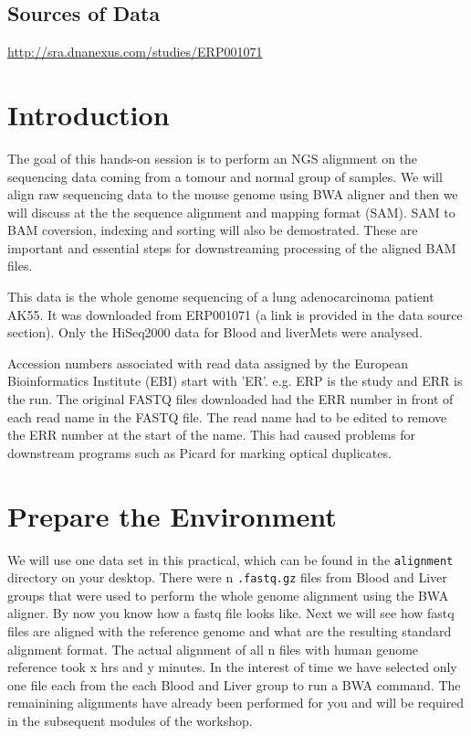 \subsection{Sources of Data}
  \url{http://sra.dnanexus.com/studies/ERP001071}

\clearpage

\section{Introduction}

\begin{information}
The goal of this hands-on session is to perform an NGS alignment on the sequencing data coming from a tomour and normal group of samples. We will align raw sequencing data to the mouse genome using BWA aligner and then we will discuss at the the sequence alignment and mapping format (SAM). SAM to BAM coversion, indexing and sorting will also be demostrated. These are important and essential steps for downstreaming processing of the aligned BAM files. 
 
This data is the whole genome sequencing of a lung adenocarcinoma patient AK55. It was downloaded from ERP001071 (a link is provided in the data source section). Only the HiSeq2000 data for Blood and liverMets were analysed.

Accession numbers associated with read data assigned by the European Bioinformatics Institute (EBI) start with 'ER'. e.g. ERP is the study and ERR is the run. The original FASTQ files downloaded had the ERR number in front of each read name in the FASTQ file. The read name had to be edited to remove the ERR number at the start of the name. This had caused problems for downstream programs such as Picard for marking optical duplicates.

\end{information}

\section{Prepare the Environment}

\begin{information}
We will use one data set in this practical, which can be found in the \texttt{alignment}
directory on your desktop.
There were n \texttt{.fastq.gz} files from Blood and Liver groups that were used to perform the whole genome alignment using the BWA aligner. By now you know how a fastq file looks like. Next we will see how fastq files are aligned with the reference genome and what are the resulting standard alignment format. The actual alignment of all n files with human genome reference took x hrs and y minutes. In the interest of time we have selected only one file each from the each Blood and Liver group to run a BWA command. The remainining alignments have already been performed for you and will be required in the subsequent modules of the workshop.
\end{information}

